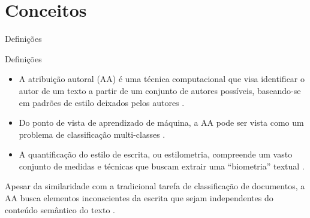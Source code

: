 \section{Conceitos}

\begin{frame}{Definições}
\begin{block}{Definições}
	\begin{itemize}\itemsep9pt
		\item A atribuição autoral (AA) é uma técnica computacional que visa identificar o autor de um texto a partir de um conjunto de autores possíveis, baseando-se em padrões de estilo deixados pelos autores \cite{Potthast2017}.
		
		\item Do ponto de vista de aprendizado de máquina, a AA pode ser vista como um problema de classificação multi-classes \cite{Stamatatos2009}.
		
		\item A quantificação do estilo de escrita, ou estilometria, compreende um vasto conjunto de medidas e técnicas que buscam extrair uma ``biometria'' textual \cite{Neal2017}.
	\end{itemize}
\end{block}

\begin{block}{}
	Apesar da similaridade com a tradicional tarefa de classificação de documentos, a AA busca elementos inconscientes da escrita que sejam independentes do conteúdo semântico do texto \cite{Keselj2003}.
\end{block}

\end{frame}



